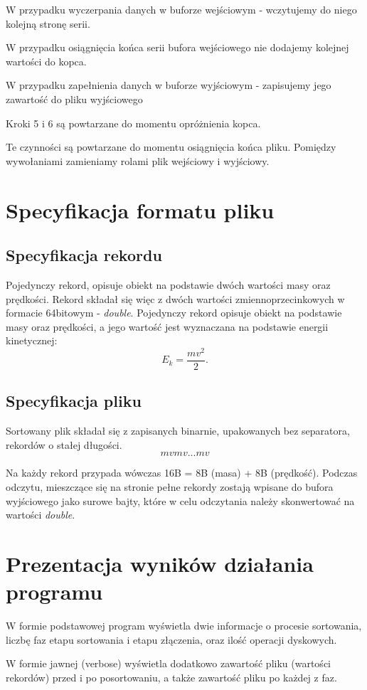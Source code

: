 \documentclass{article}
\begin{document}
W przypadku wyczerpania danych w buforze wejściowym - wczytujemy do niego kolejną stronę serii.

W przypadku osiągnięcia końca serii bufora wejściowego nie dodajemy kolejnej wartości do kopca.

W przypadku zapełnienia danych w buforze wyjściowym - zapisujemy jego zawartość do pliku wyjściowego 

Kroki 5 i 6 są powtarzane do momentu opróżnienia kopca.

Te czynności są powtarzane do momentu osiągnięcia końca pliku. Pomiędzy wywołaniami zamieniamy rolami plik wejściowy i wyjściowy.

\section{Specyfikacja formatu pliku}
\subsection{Specyfikacja rekordu}
Pojedynczy rekord, opisuje obiekt na podstawie dwóch wartości masy oraz prędkości. Rekord składał się więc z dwóch wartości zmiennoprzecinkowych w formacie 64bitowym - \textit{double}. Pojedynczy rekord opisuje obiekt na podstawie masy oraz prędkości, 
a jego wartość jest wyznaczana na podstawie energii kinetycznej:
\[
E_k = \frac{mv^2}{2}.
\]

\subsection{Specyfikacja pliku}
Sortowany plik składał się z zapisanych binarnie, upakowanych bez separatora, rekordów o stałej długości.
\[
mvmv...mv
\]

Na każdy rekord przypada wówczas 16B = 8B (masa) + 8B (prędkość). Podczas odczytu, mieszczące się na stronie pełne rekordy zostają wpisane do bufora wyjściowego jako surowe bajty, które w celu odczytania należy skonwertować na wartości \textit{double}.

\section{Prezentacja wyników działania programu}
W formie podstawowej program wyświetla dwie informacje o procesie sortowania, liczbę faz etapu sortowania i etapu złączenia, oraz ilość operacji dyskowych.

W formie jawnej (verbose) wyświetla dodatkowo zawartość pliku (wartości rekordów) przed i po posortowaniu, a także zawartość pliku po każdej z faz.
\end{document}
